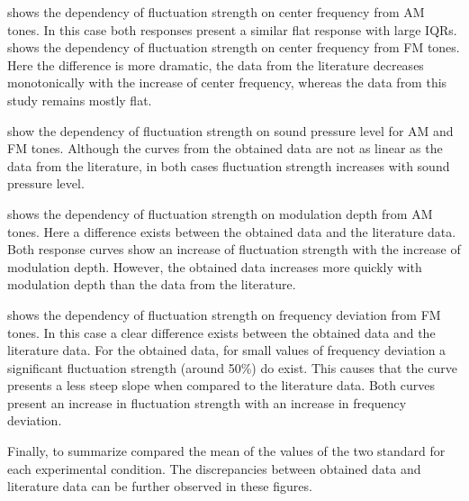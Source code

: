 \documentclass[../../main.tex]{subfiles}
\begin{document}
 shows the dependency of fluctuation strength
on center frequency from \gls{AM} tones. In this case both responses present a
similar flat response with large \gls{IQR}s. 
shows the dependency of fluctuation strength on center frequency from \gls{FM}
tones. Here the difference is more dramatic, the data from the literature
decreases monotonically with the increase of center frequency, whereas the data
from this study remains mostly flat.

 show the
dependency of fluctuation strength on sound pressure level for \gls{AM} and
\gls{FM} tones. Although the curves from the obtained data are not as linear as
the data from the literature, in both cases fluctuation strength increases with
sound pressure level.

 shows the dependency of fluctuation strength
on modulation depth from \gls{AM} tones. Here a difference exists between the
obtained data and the literature data. Both response curves show an increase
of fluctuation strength with the increase of modulation depth. However, the
obtained data increases more quickly with modulation depth than the data from
the literature.

 shows the dependency of fluctuation strength
on frequency deviation from \gls{FM} tones. In this case a clear difference
exists between the obtained data and the literature data. For the obtained data,
for small values of frequency deviation a significant fluctuation strength
(around 50\%) do exist. This causes that the curve presents a less steep slope
when compared to the literature data. Both curves present an increase in
fluctuation strength with an increase in frequency deviation.

Finally, to summarize  compared the
mean of the values of the two standard for each experimental condition. The
discrepancies between obtained data and literature data can be further observed
in these figures.
\end{document}
